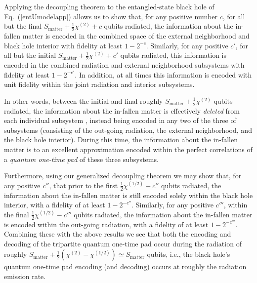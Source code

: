 \documentclass[twocolumn,aps,showpacs,prl]{revtex4}
\begin{document}
Applying the decoupling theorem \cite{Abey06app} to the entangled-state
black hole of Eq.~(\ref{entUmodelapp}) allows us to show that, for any
positive number $c$, for all but the final
$S_{\text{matter}}+\frac{1}{2}\chi^{(2)}+c$ qubits radiated, the
information about the in-fallen matter is encoded in the combined space
of the external neighborhood and black hole interior with fidelity
at least $1-2^{-c}$. Similarly, for any positive $c'$, for all
but the initial $S_{\text{matter}}+\frac{1}{2}\chi^{(2)}+c'$ qubits
radiated, this information is encoded in the combined radiation and
external neighborhood subsystems with fidelity at least $1-2^{-c'}$.
In addition, at all times this information is encoded with unit
fidelity within the joint radiation and interior subsystems.

In other words, between the initial and final roughly
$S_{\text{matter}}+\frac{1}{2}\chi^{(2)}$ qubits radiated, the
information about the in-fallen matter is effectively {\it deleted\/}
from each individual subsystem \cite{meapp,Kretschmannapp}, instead
being encoded in any two of the three of subsystems (consisting of
the out-going radiation, the external neighborhood, and the black
hole interior). During this time, the information about the
in-fallen matter is to an excellent approximation encoded within
the perfect correlations of a {\it quantum one-time pad}
\cite{Leung02app,meapp} of these three subsystems.

Furthermore, using our generalized decoupling theorem we may show that,
for any positive $c''$, that prior to the first
$\frac{1}{2}\chi^{(1/2)} -c''$ qubits radiated,
the information about the in-fallen matter is still encoded solely
within the black hole interior, with a fidelity of at least
$1-2^{-c''}$. Similarly, for any positive $c'''$, within the final
$\frac{1}{2}\chi^{(1/2)} -c'''$ qubits radiated, the information about
the in-fallen matter is encoded within the out-going radiation,
with a fidelity of at least $1-2^{-c'''}$. Combining these with the
above results we see that both the encoding and decoding of the
tripartite quantum one-time pad occur during the radiation of roughly
$S_{\text{matter}}+\frac{1}{2}(\chi^{(2)}-\chi^{(1/2)})
\simeq S_{\text{matter}}$ qubits, i.e., the black hole's quantum
one-time pad encoding (and decoding) occurs at roughly the radiation
emission rate.
\end{document}

